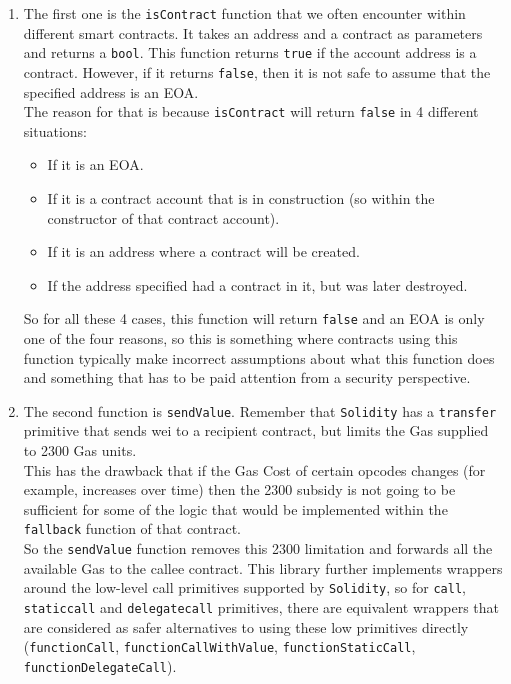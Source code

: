 \begin{enumerate}
\def\labelenumi{\arabic{enumi}.}
\item
  The first one is the \texttt{isContract} function that we often
  encounter within different smart contracts. It takes an address and a
  contract as parameters and returns a \texttt{bool}. This function
  returns \texttt{true} if the account address is a contract. However,
  if it returns \texttt{false}, then it is not safe to assume that the
  specified address is an EOA.\\

  The reason for that is because \texttt{isContract} will return
  \texttt{false} in 4 different situations:

  \begin{itemize}
  \tightlist
  \item
    If it is an EOA.
  \item
    If it is a contract account that is in construction (so within the
    constructor of that contract account).
  \item
    If it is an address where a contract will be created.
  \item
    If the address specified had a contract in it, but was later
    destroyed.
  \end{itemize}

  So for all these 4 cases, this function will return \texttt{false} and
  an EOA is only one of the four reasons, so this is something where
  contracts using this function typically make incorrect assumptions
  about what this function does and something that has to be paid
  attention from a security perspective.
\item
  The second function is \texttt{sendValue}. Remember that
  \texttt{Solidity} has a \texttt{transfer} primitive that sends wei to
  a recipient contract, but limits the Gas supplied to 2300 Gas units.\\

  This has the drawback that if the Gas Cost of certain opcodes changes
  (for example, increases over time) then the 2300 subsidy is not going
  to be sufficient for some of the logic that would be implemented
  within the \texttt{fallback} function of that contract.\\

  So the \texttt{sendValue} function removes this 2300 limitation and
  forwards all the available Gas to the callee contract. This library
  further implements wrappers around the low-level call primitives
  supported by \texttt{Solidity}, so for \texttt{call},
  \texttt{staticcall} and \texttt{delegatecall} primitives, there are
  equivalent wrappers that are considered as safer alternatives to using
  these low primitives directly (\texttt{functionCall},
  \texttt{functionCallWithValue}, \texttt{functionStaticCall},
  \texttt{functionDelegateCall}).
\end{enumerate}

